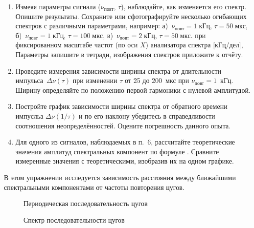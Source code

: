\begin{lab:task}
\begin{enumerate}
\item Измеяя параметры сигнала ($\nu_{повт}$, $\tau$),
наблюдайте, как изменяется его спектр. Опишите результаты.
Сохраните или сфотографируйте несколько огибающих спектров с различными
параметрами, например:
а)~$\nu_{повт}=1\;кГц$, $\tau=50\;мкс$,
б)~$\nu_{повт}=1\;кГц$, $\tau=100\;мкс$,
в)~$\nu_{повт}=2\;кГц$, $\tau=50\;мкс$.
при фиксированном масштабе частот (по оси $X$) анализатора спектра [кГц/дел],
Параметры запишите в тетради, изображения спектров приложите к отчёту.

\item Проведите измерения зависимости ширины спектра от длительности
импульса~$\Delta \nu(\tau)$ при изменении $\tau$ от 25 до 200~мкс при
$\nu_\text{повт}=1$~кГц. Ширину определяйте по положению первой гармоники
с нулевой амплитудой.

\item Постройте график зависимости ширины спектра от обратного времени импусльа
$\Delta \nu(1/\tau)$ и по его наклону убедитесь в справедливости соотношения
неопределённостей. Оцените погрешность данного опыта.

\item Для одного из сигналов, наблюдаемых в п.~6, рассчитайте теоретические
значения амплитуд спектральных компонент по формуле .
Сравните измеренные значения с теоретическими, изобразив их на одном графике.

\end{enumerate}


В этом упражнении исследуется зависимость расстояния между ближайшими
спектральными компонентами от частоты повторения цугов.

\begin{figure}[h!]
\hfil\hfil
\begin{minipage}{0.4\textwidth}
    \caption{Периодическая последовательность цугов}
\end{minipage}
\hfil
\begin{minipage}{0.4\textwidth}
    \caption{Спектр последовательности цугов}
\end{minipage}
\end{figure}



\end{lab:task}
